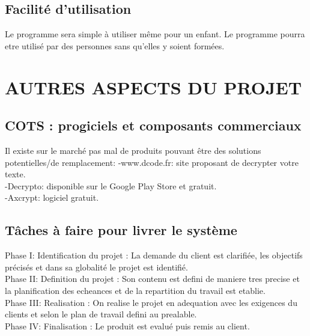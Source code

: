 \documentclass[a4]{article}
\begin{document}
		\subsection{Facilité d’utilisation}
				Le programme sera simple à utiliser même pour un enfant.
				Le programme pourra etre utilisé par des personnes sans qu'elles y soient formées.
		
	\section{AUTRES ASPECTS DU PROJET}
		\subsection{COTS : progiciels et composants commerciaux}
			Il existe sur le marché pas mal de produits pouvant être des solutions potentielles/de remplacement:
			-www.dcode.fr: site proposant de decrypter votre texte. \\
			-Decrypto: disponible sur le Google Play Store et gratuit.\\
			-Axcrypt: logiciel gratuit.
		\subsection{Tâches à faire pour livrer le système}
			Phase I: Identification du projet : La demande du client est clarifiée, les objectifs
			 précisés et dans sa globalité le projet est identifié.\\
			Phase II: Definition du projet : Son contenu est defini de maniere tres precise et la
			 planification des echeances et de la repartition du travail est etablie.\\
			Phase III: Realisation : On realise le projet en adequation avec les exigences du 
			clients et selon le plan de travail defini au prealable.\\
			Phase IV: Finalisation : Le produit est evalué puis remis au client.
			
			
			
\end{document}
